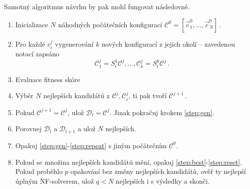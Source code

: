 Samotný algoritmus návrhu by pak mohl fungovat následovně.
\begin{enumerate}
	\item Inicializace $N$ náhodných počátečních konfigurací $\mathcal{C}^0 = [\vec{c}_1^0, \dots,\vec{c}_N^0]$\,.
	\item \label{step:gen} Pro každé $c_i^j$ vygenerování $k$ nových konfigurací z jejich okolí -- zavedenou notací zapsáno
		\begin{equation}
			\mathcal{C}_1^j = S_{\epsilon}^1 \mathcal{C}^j, \dots, \mathcal{C}_k^j = S_{\epsilon}^k \mathcal{C}^j\,.
		\end{equation}
	\item \label{step:eval} Evaluace fitness skóre
	\item \label{step:iter} Výběr $N$ nejlepších kandidátů z $\mathcal{C}^j, \mathcal{C}_i^j$, ti pak tvoří $\mathcal{C}^{j+1}$\,.
	\item \label{step:repeat} Pokud $\mathcal{C}^{j+1} = \mathcal{C}^{j}$, ulož $\mathcal{D}_l = \mathcal{C}^j$. Jinak pokračuj 
		krokem \ref{step:gen}.
	\item \label{step:best} Porovnej $\mathcal{D}_l$ a $\mathcal{D}_{l+1}$ a ulož $N$ nejlepších.
	\item \label{step:reset} Opakuj \ref{step:gen}-\ref{step:repeat} s jiným počátečním $\mathcal{C}^0$.
	\item Pokud se množina nejlepších kandidátů mění, opakuj \ref{step:best}-\ref{step:reset}. Pokud proběhlo $p$ opakování bez změny nejlepších 
		kandidátů, ověř ty nejlepší úplným NF-solverem, ulož $q<N$ nejlepších i s výsledky a skonči.
\end{enumerate}






